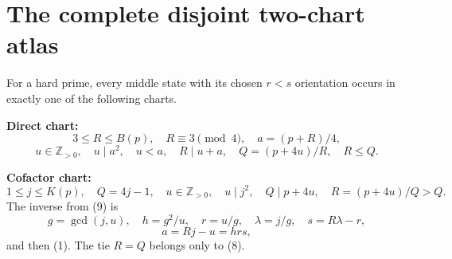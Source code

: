 \section{The complete disjoint two-chart atlas}
\begin{theorem}
For a hard prime, every middle state with its chosen $r<s$ orientation occurs
in exactly one of the following charts.

\textbf{Direct chart:}
\[
 3\le R\le B(p),\quad R\equiv3\pmod4,\quad a=(p+R)/4,
\]
\[
 u\in\mathbb Z_{>0},\quad u\mid a^2,\quad u<a,\quad R\mid u+a,\quad
 Q=(p+4u)/R,\quad R\le Q.                               \tag{8}
\]

\textbf{Cofactor chart:}
\[
 1\le j\le K(p),\quad Q=4j-1,\quad
 u\in\mathbb Z_{>0},\quad u\mid j^2,\quad Q\mid p+4u,\quad
 R=(p+4u)/Q>Q.                                             \tag{9}
\]
The inverse from (9) is
\[
 g=\gcd(j,u),\quad
 \boxed{h=g^2/u,\quad r=u/g,\quad\lambda=j/g,\quad s=R\lambda-r,}
                                                                    \tag{10}
\]
\[
 a=Rj-u=hrs,
\]
and then (1). The tie $R=Q$ belongs only to (8).
\end{theorem}
